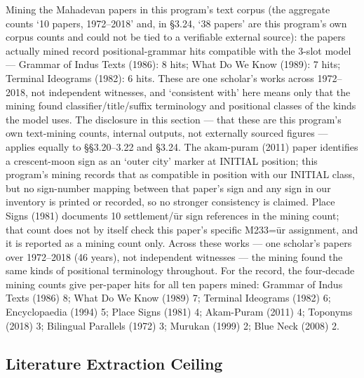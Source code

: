 \documentclass[11pt]{article}
\begin{document}
Mining the Mahadevan papers in this program's text corpus (the aggregate counts `10 papers, 1972--2018' and, in §3.24, `38 papers' are this program's own corpus counts and could not be tied to a verifiable external source): the papers actually mined record positional-grammar hits compatible with the 3-slot model --- Grammar of Indus Texts (1986): 8 hits; What Do We Know (1989): 7 hits; Terminal Ideograms (1982): 6 hits. These are one scholar's works across 1972--2018, not independent witnesses, and `consistent with' here means only that the mining found classifier/title/suffix terminology and positional classes of the kinds the model uses. The disclosure in this section --- that these are this program's own text-mining counts, internal outputs, not externally sourced figures --- applies equally to §§3.20--3.22 and §3.24. The akam-puram (2011) paper identifies a crescent-moon sign as an `outer city' marker at INITIAL position; this program's mining records that as compatible in position with our INITIAL class, but no sign-number mapping between that paper's sign and any sign in our inventory is printed or recorded, so no stronger consistency is claimed. Place Signs (1981) documents 10 settlement/ūr sign references in the mining count; that count does not by itself check this paper's specific M233=ūr assignment, and it is reported as a mining count only. Across these works --- one scholar's papers over 1972--2018 (46 years), not independent witnesses --- the mining found the same kinds of positional terminology throughout. For the record, the four-decade mining counts give per-paper hits for all ten papers mined: Grammar of Indus Texts (1986) 8; What Do We Know (1989) 7; Terminal Ideograms (1982) 6; Encyclopaedia (1994) 5; Place Signs (1981) 4; Akam-Puram (2011) 4; Toponyms (2018) 3; Bilingual Parallels (1972) 3; Murukan (1999) 2; Blue Neck (2008) 2.

\subsection{Literature Extraction Ceiling
}\label{literature-extraction-ceiling-phase-161162165}
\end{document}
